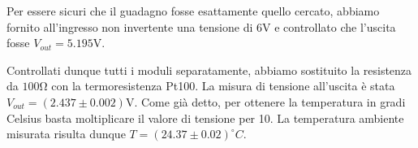 Per essere sicuri che il guadagno fosse esattamente quello cercato, abbiamo fornito all'ingresso non invertente una tensione di $6\si{\volt}$ e controllato che l'uscita fosse $V_{out}=5.195 \si{\volt}$. 

Controllati dunque tutti i moduli separatamente, abbiamo sostituito la resistenza da $100\si{\ohm}$ con la termoresistenza Pt100. La misura di tensione all'uscita è stata $V_{out}=(2.437\pm 0.002)\si{\volt}$. Come già detto, per ottenere la temperatura in gradi Celsius basta moltiplicare il valore di tensione per 10. La temperatura ambiente misurata risulta dunque $T=(24.37\pm0.02)^{\circ}C$.











